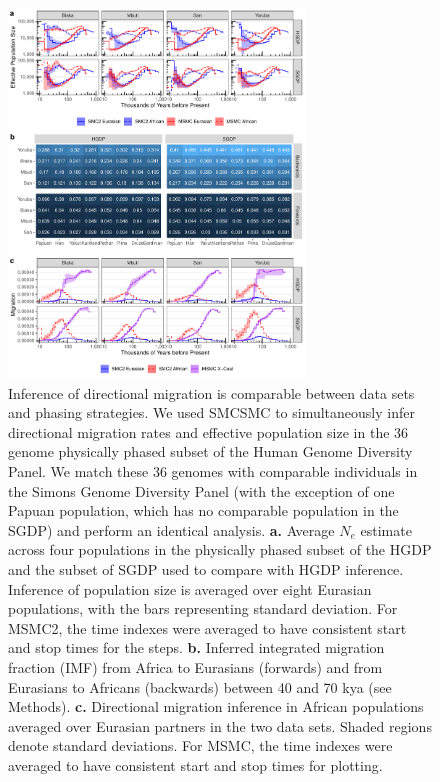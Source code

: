 \begin{figure}
	\centering
	\includegraphics[width=0.7\textwidth]{plot/both_figure.pdf}
	\caption[Migration inference is comparable between phasing strategies]{Inference of directional migration is comparable between data sets and phasing strategies. We used SMCSMC to simultaneously infer directional migration rates and effective population size in the 36 genome physically phased subset of the Human Genome Diversity Panel. We match these 36 genomes with comparable individuals in the Simons Genome Diversity Panel (with the exception of one Papuan population, which has no comparable population in the SGDP) and perform an identical analysis. {\bf a.} Average $N_e$ estimate across four populations in the physically phased subset of the HGDP and the subset of SGDP used to compare with HGDP inference. Inference of population size is averaged over eight Eurasian populations, with the bars representing standard deviation. For MSMC2, the time indexes were averaged to have consistent start and stop times for the steps. {\bf b.} Inferred integrated migration fraction (IMF) from Africa to Eurasians (forwards) and from Eurasians to Africans (backwards) between 40 and 70 kya (see Methods). {\bf c.} Directional migration inference in African populations averaged over Eurasian partners in the two data sets. Shaded regions denote standard deviations. For MSMC, the time indexes were averaged to have consistent start and stop times for plotting.}
	\label{fig:both}
\end{figure}


